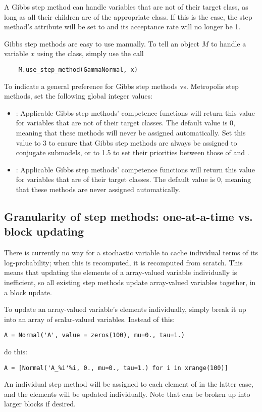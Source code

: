 A Gibbs step method can handle variables that are not of their target class, as long as all their children are of the appropriate class. If this is the case, the step method's  attribute will be set to  and its acceptance rate will no longer be 1.

Gibbs step methods are easy to use manually. To tell an 
object $M$ to handle a variable $x$ using the  class,
simply use the call
\begin{verbatim}
    M.use_step_method(GammaNormal, x)
\end{verbatim}

To indicate a general preference for Gibbs step methods vs. Metropolis step methods, set the following global integer values:
\begin{itemize}
    \item {}: Applicable Gibbs step methods' competence functions will return this value for variables that are not of their target classes. The default value is 0, meaning that these methods will never be assigned automatically. Set this value to 3 to ensure that Gibbs step methods are always be assigned to conjugate submodels, or to 1.5 to set their priorities between those of  and .
    \item {}: Applicable Gibbs step methods' competence functions will return this value for variables that are of their target classes. The default value is 0, meaning that these methods are never assigned automatically.
\end{itemize}


\subsection*{Granularity of step methods: one-at-a-time vs. block updating} 
There is currently no way for a stochastic variable to cache individual terms of its log-probability; when this is recomputed, it is recomputed from scratch. This means that updating the elements of a array-valued variable individually is inefficient, so all existing step methods update array-valued variables together, in a block update.

To update an array-valued variable's elements individually, simply break it up into an array of scalar-valued variables. Instead of this:
\begin{verbatim}
A = Normal('A', value = zeros(100), mu=0., tau=1.)    
\end{verbatim}
do this:
\begin{verbatim}
A = [Normal('A_%i'%i, 0., mu=0., tau=1.) for i in xrange(100)]
\end{verbatim}
An individual step method will be assigned to each element of  in the latter case, and the elements will be updated individually. Note that  can be broken up into larger blocks if desired.

